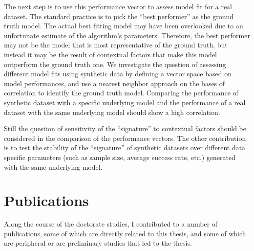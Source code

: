 The next step is to use this performance vector to assess model fit for a real dataset. The standard practice is to pick the ``best performer'' as the ground truth model. The actual best fitting model may have been overlooked due to an unfortunate estimate of the algorithm's parameters.  Therefore, the best performer may not be the model that is most representative of the ground truth, but instead it may be the result of contextual factors that make this model outperform the ground truth one. We investigate the question of assessing different model fits using synthetic data by defining a vector space based on model performances, and use a nearest neighbor approach on the bases of correlation to identify the ground truth model. Comparing the performance of synthetic dataset with a specific underlying model and the performance of a real dataset with the same underlying model should show a high correlation. 

Still the question of sensitivity of the ``signature'' to contextual factors should be considered in the comparison of the performance vectors. The other contribution is to test the stability of the ``signature'' of synthetic datasets over different data specific parameters (such as sample size, average success rate, etc.) generated with the same underlying model. 


\section{Publications}

Along the course of the doctorate studies, I contributed to a number of publications, some of which are directly related to this thesis, and some of which are peripheral or are preliminary studies that led to the thesis.

